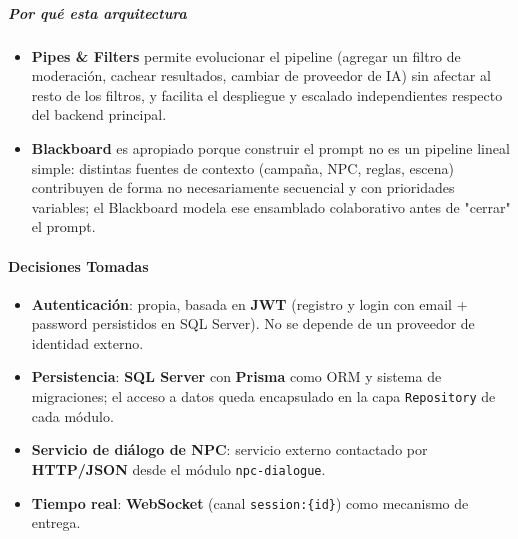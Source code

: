 \subparagraph{Por qué esta arquitectura}
\begin{itemize}[itemsep=2pt,topsep=2pt]
\item \textbf{Pipes \& Filters} permite evolucionar el pipeline (agregar un filtro de moderación, cachear resultados, cambiar de proveedor de IA) sin afectar al resto de los filtros, y facilita el despliegue y escalado independientes respecto del backend principal.
\item \textbf{Blackboard} es apropiado porque construir el prompt no es un pipeline lineal simple: distintas fuentes de contexto (campaña, NPC, reglas, escena) contribuyen de forma no necesariamente secuencial y con prioridades variables; el Blackboard modela ese ensamblado colaborativo antes de "cerrar" el prompt.
\end{itemize}
\paragraph{Decisiones Tomadas}
\begin{itemize}[itemsep=2pt,topsep=2pt]
\item \textbf{Autenticación}: propia, basada en \textbf{JWT} (registro y login con email + password persistidos en SQL Server). No se depende de un proveedor de identidad externo.
\item \textbf{Persistencia}: \textbf{SQL Server} con \textbf{Prisma} como ORM y sistema de migraciones; el acceso a datos queda encapsulado en la capa \texttt{Repository} de cada módulo.
\item \textbf{Servicio de diálogo de NPC}: servicio externo contactado por \textbf{HTTP/JSON} desde el módulo \texttt{npc-dialogue}.
\item \textbf{Tiempo real}: \textbf{WebSocket} (canal \texttt{session:\{id\}}) como mecanismo de entrega.
\end{itemize}
